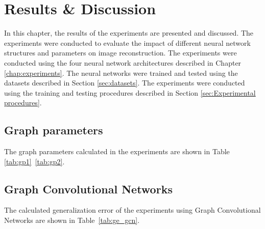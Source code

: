 \chapter{Results \& Discussion}\label{chap:results}

In this chapter, the results of the experiments are presented and discussed. The experiments were conducted to evaluate the impact of different neural network structures and parameters on image reconstruction. The experiments were conducted using the four neural network architectures described in Chapter \ref{chap:experiments}. The neural networks were trained and tested using the datasets described in Section \ref{sec:datasets}. The experiments were conducted using the training and testing procedures described in Section \ref{sec:Experimental procedures}.

\section{Graph parameters}

The graph parameters calculated in the experiments are shown in Table \ref{tab:gp1}~\ref{tab:gp2}. 

\section{Graph Convolutional Networks}
The calculated generalization error of the experiments using Graph Convolutional Networks are shown in Table~\ref{tab:ge_gcn}.


